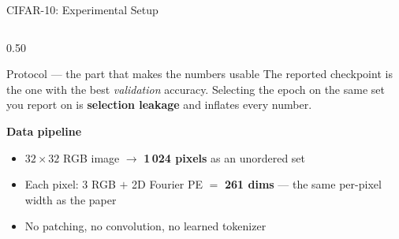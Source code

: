 \documentclass[aspectratio=169,11pt]{beamer}
\begin{document}
\begin{frame}[shrink=5]{CIFAR-10: Experimental Setup}
\begin{columns}[T]
\begin{column}{0.50\textwidth}
\begin{block}{Protocol --- the part that makes the numbers usable}
        \vspace{0.4em}
        The reported checkpoint is the one with the best \emph{validation} accuracy. Selecting the epoch on the same set you report on is \textbf{selection leakage} and inflates every number.
      \end{block}

      \vspace{0.4em}
      \textbf{Data pipeline}
      \begin{itemize}
        \item $32\!\times\!32$ RGB image $\to$ \textbf{1\,024 pixels} as an unordered set
        \item Each pixel: 3 RGB $+$ 2D Fourier PE $= $ \textbf{261 dims} --- the same per-pixel width as the paper
        \item No patching, no convolution, no learned tokenizer
      \end{itemize}
    \end{column}
  \end{columns}
\end{frame}
\end{document}
